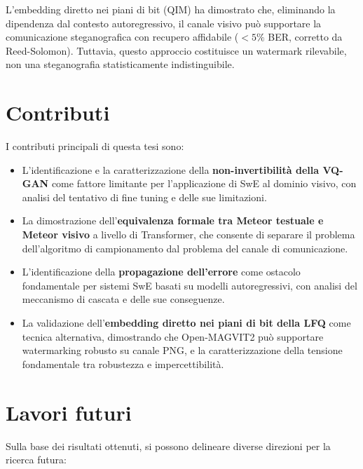 L'embedding diretto nei piani di bit (QIM) ha dimostrato che, eliminando la dipendenza dal contesto autoregressivo, il canale visivo può supportare la comunicazione steganografica con recupero affidabile ($< 5\%$ BER, corretto da Reed-Solomon). Tuttavia, questo approccio costituisce un watermark rilevabile, non una steganografia statisticamente indistinguibile.

\section{Contributi}

I contributi principali di questa tesi sono:

\begin{itemize}
	\item L'identificazione e la caratterizzazione della \textbf{non-invertibilità della VQ-GAN} come fattore limitante per l'applicazione di SwE al dominio visivo, con analisi del tentativo di fine tuning e delle sue limitazioni.
	
	\item La dimostrazione dell'\textbf{equivalenza formale tra Meteor testuale e Meteor visivo} a livello di Transformer, che consente di separare il problema dell'algoritmo di campionamento dal problema del canale di comunicazione.
	
	\item L'identificazione della \textbf{propagazione dell'errore} come ostacolo fondamentale per sistemi SwE basati su modelli autoregressivi, con analisi del meccanismo di cascata e delle sue conseguenze.
	
	\item La validazione dell'\textbf{embedding diretto nei piani di bit della LFQ} come tecnica alternativa, dimostrando che Open-MAGVIT2 può supportare watermarking robusto su canale PNG, e la caratterizzazione della tensione fondamentale tra robustezza e impercettibilità.
\end{itemize}

\section{Lavori futuri}

Sulla base dei risultati ottenuti, si possono delineare diverse direzioni per la ricerca futura:

